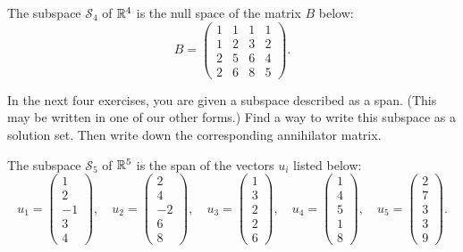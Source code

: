 \documentclass[elementsmain.tex]{subfiles}
\begin{document}
\begin{exercise} The subspace $\mathcal{S}_4$ of $\mathbb{R}^4$ is the null space of the matrix $B$ below:
\[
B = \begin{pmatrix} 1 & 1 & 1 & 1 \\ 1 & 2 & 3 & 2 \\ 2 & 5 & 6 & 4 \\ 
2 & 6 & 8 & 5 \end{pmatrix}.
\]
\end{exercise}


In the next four exercises, you are given a subspace described as a span. (This may be written in one of our other forms.) Find a way to write this subspace as a solution set. Then write down the corresponding annihilator matrix.

\begin{exercise} The subspace $\mathcal{S}_5$ of $\mathbb{R}^5$ is the span of the vectors $u_i$ listed below:
\[
u_1 = \begin{pmatrix} 1 \\ 2 \\ -1 \\ 3 \\ 4 \end{pmatrix}, \quad 
u_2 = \begin{pmatrix} 2 \\ 4 \\ -2 \\ 6 \\ 8 \end{pmatrix}, \quad 
u_3 = \begin{pmatrix} 1 \\ 3 \\ 2 \\ 2 \\ 6 \end{pmatrix}, \quad 
u_4 = \begin{pmatrix} 1 \\ 4 \\ 5 \\ 1 \\ 8 \end{pmatrix}, \quad 
u_5 = \begin{pmatrix} 2 \\ 7 \\ 3 \\ 3 \\ 9 \end{pmatrix}. 
\]
\end{exercise}
\end{document}
